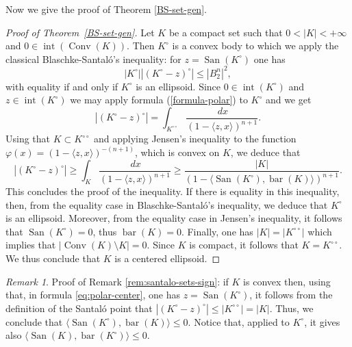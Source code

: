 \documentclass[10pt]{amsart}
\theoremstyle{definition}
\theoremstyle{remark}
\newtheorem{rem}[thm]{Remark}
\newcommand{\conv}{\operatorname{Conv}}
\newcommand{\inte}{\operatorname{int}}
\newcommand{\bary}{\operatorname{bar}}
\newcommand{\san}{\operatorname{San}}
\begin{document}
Now we give the proof of Theorem \ref{BS-set-gen}.
\begin{proof}[Proof of Theorem~\ref{BS-set-gen}]
Let $K$ be a compact set such that $0<|K|<+\infty$ and $0\in \inte(\conv(K))$. Then $K^\circ$ is a convex body to which we apply the classical Blaschke-Santal\'o's inequality: for $z=\san(K^\circ)$ one has 
\[
|K^\circ||(K^\circ-z)^\circ|\le |B_2^n|^2,
\]
with equality if and only if $K^\circ$ is an ellipsoid.
Since $0\in \inte(K^\circ)$ and $z\in\inte(K^\circ)$ we may apply formula (\ref{formula-polar}) to $K^\circ$ and we get
\[
|(K^\circ-z)^\circ|=\int_{K^{\circ\circ}}\frac{\,dx}{(1-\langle z,x\rangle)^{n+1}}.
\]
Using that $K\subset K^{\circ\circ}$ and applying Jensen's inequality to the function $\varphi(x)=(1-\langle z,x\rangle)^{-(n+1)}$, which is convex on $K$, we deduce that 
\begin{equation}\label{eq:polar-center}
|(K^\circ-z)^\circ|\ge\int_{K}\frac{\,dx}{(1-\langle z,x\rangle)^{n+1}}\ge\frac{|K|}{(1-\langle \san(K^\circ),\bary(K)\rangle)^{n+1}}.
\end{equation}
This concludes the proof of the inequality. If there is equality in this inequality, then, from the equality case in Blaschke-Santal\'o's inequality, we deduce that $K^\circ$ is an ellipsoid. Moreover, from the equality case in Jensen's inequality, it follows that $\san(K^\circ)=0$, thus $\bary(K)=0$. Finally, one has $|K|=|K^{\circ\circ}|$ which implies that $|\conv(K)\setminus K|=0$. Since $K$ is compact, it follows that $K=K^{\circ\circ}$. We thus conclude that $K$ is a centered ellipsoid.  
\end{proof}

\begin{rem}\label{rem:santalo-sign}
 Proof of Remark \ref{rem:santalo-sets-sign}: if $K$ is convex then, using that, in formula \eqref{eq:polar-center}, one has $z=\san(K^\circ)$, it follows from the definition of the Santal\'o point that $|(K^\circ-z)^\circ|\le |K^{\circ\circ}|=|K|$. Thus, we conclude that $\langle \san(K^\circ),\bary(K)\rangle\le0$. Notice that, applied to $K^\circ$, it gives also $\langle \san(K),\bary(K^\circ)\rangle\le0$.
 \end{rem}
\end{document}
